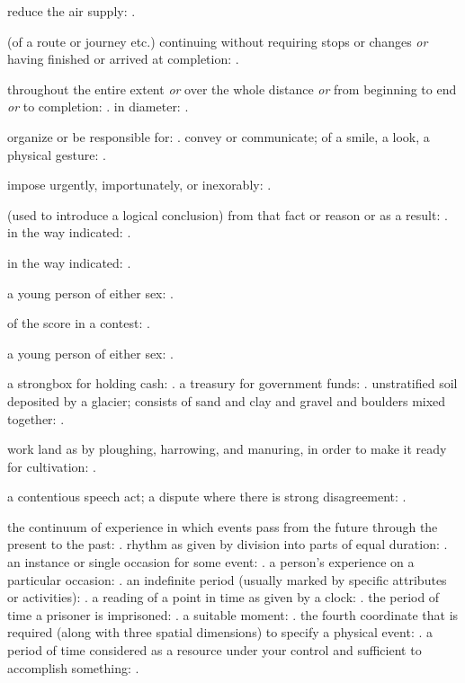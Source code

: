   reduce the air supply: .

  (of a route or journey etc.) continuing without requiring stops or changes \textit{or} having finished or arrived at completion: .

  throughout the entire extent \textit{or} over the whole distance \textit{or} from beginning to end \textit{or} to completion: . in diameter: .

  organize or be responsible for: . convey or communicate; of a smile, a look, a physical gesture: .

  impose urgently, importunately, or inexorably: .

  (used to introduce a logical conclusion) from that fact or reason or as a result: . in the way indicated: .

  in the way indicated: .

  a young person of either sex: .

  of the score in a contest: .

  a young person of either sex: .

  a strongbox for holding cash: . a treasury for government funds: . unstratified soil deposited by a glacier; consists of sand and clay and gravel and boulders mixed together: .

  work land as by ploughing, harrowing, and manuring, in order to make it ready for cultivation: .

  a contentious speech act; a dispute where there is strong disagreement: .

  the continuum of experience in which events pass from the future through the present to the past: . rhythm as given by division into parts of equal duration: . an instance or single occasion for some event: . a person's experience on a particular occasion: . an indefinite period (usually marked by specific attributes or activities): . a reading of a point in time as given by a clock: . the period of time a prisoner is imprisoned: . a suitable moment: . the fourth coordinate that is required (along with three spatial dimensions) to specify a physical event: . a period of time considered as a resource under your control and sufficient to accomplish something: .


